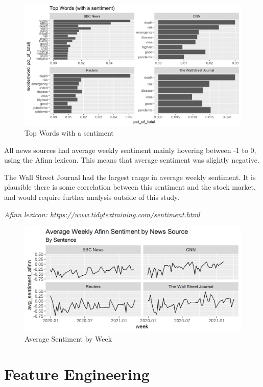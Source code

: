 \documentclass[
]{article}
\begin{document}
\begin{figure}
\centering
\includegraphics{../figures/top_words_with_sentiment.png}
\caption{Top Words with a sentiment}
\end{figure}

All news sources had average weekly sentiment mainly hovering between -1
to 0, using the Afinn lexicon. This means that average sentiment was
slightly negative.

The Wall Street Journal had the largest range in average weekly
sentiment. It is plausible there is some correlation between this
sentiment and the stock market, and would require further analysis
outside of this study.

\emph{Afinn lexicon:
\url{https://www.tidytextmining.com/sentiment.html}}

\begin{figure}
\centering
\includegraphics{../figures/sentence_afinn_sentiment_week.png}
\caption{Average Sentiment by Week}
\end{figure}

\hypertarget{feature-engineering}{%
\section{Feature Engineering}\label{feature-engineering}}
\end{document}
